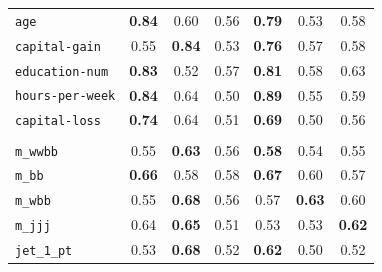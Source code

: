 \begin{table}[htbp]
\begin{tabular}{@{}l ccc ccc@{}}
\texttt{age} & \textbf{0.84} & 0.60 & 0.56 & \textbf{0.79} & 0.53 & 0.58 \\
\texttt{capital-gain} & 0.55 & \textbf{0.84} & 0.53 & \textbf{0.76} & 0.57 & 0.58 \\
\texttt{education-num} & \textbf{0.83} & 0.52 & 0.57 & \textbf{0.81} & 0.58 & 0.63 \\
\texttt{hours-per-week} & \textbf{0.84} & 0.64 & 0.50 & \textbf{0.89} & 0.55 & 0.59 \\
\texttt{capital-loss} & \textbf{0.74} & 0.64 & 0.51 & \textbf{0.69} & 0.50 & 0.56 \\
\addlinespace[3pt]
\multicolumn{7}{@{}l}{\textit{HIGGS} \quad {\scriptsize(\acs{AUC} del modelo: 0.785)}} \\
\texttt{m\_wwbb} & 0.55 & \textbf{0.63} & 0.56 & \textbf{0.58} & 0.54 & 0.55 \\
\texttt{m\_bb} & \textbf{0.66} & 0.58 & 0.58 & \textbf{0.67} & 0.60 & 0.57 \\
\texttt{m\_wbb} & 0.55 & \textbf{0.68} & 0.56 & 0.57 & \textbf{0.63} & 0.60 \\
\texttt{m\_jjj} & 0.64 & \textbf{0.65} & 0.51 & 0.53 & 0.53 & \textbf{0.62} \\
\texttt{jet\_1\_pt} & 0.53 & \textbf{0.68} & 0.52 & \textbf{0.62} & 0.50 & 0.52 \\
\bottomrule
\end{tabular}
\end{table}
